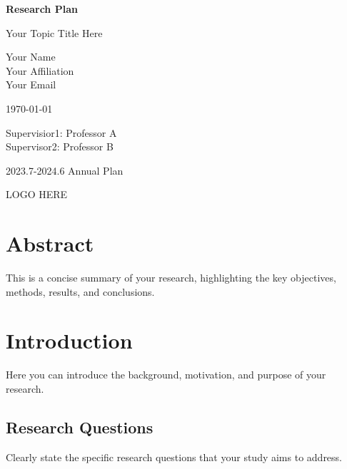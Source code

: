 \documentclass{article}
\newcommand\supervisorinfo{
    Supervisior1: Professor A \\
    Supervisor2: Professor B
}
\newcommand\authorinfo{
    Your Name \\ 
    Your Affiliation \\ 
    Your Email
}
\begin{document}
\pagestyle{fancy}
\fancyhead[L]{\leftmark}

\begin{titlepage}
    \begin{center}
        \vspace*{3cm}
            
        \Huge
        \textbf{Research Plan}
            
        \vspace{1cm}
        \huge
        Your Topic Title Here
        
        
            
        \vspace{1.5cm}
        \Large
        
        \authorinfo
        
        \today
        
            
        \vfill
        
        \supervisorinfo
        
        2023.7-2024.6 Annual Plan
            
        \vspace{1cm}
        
       	LOGO HERE
        
        \Large
            
    \end{center}
\end{titlepage}


\newpage

\tableofcontents

\newpage

\section*{Abstract}
This is a concise summary of your research, highlighting the key objectives, methods, results, and conclusions. 

\section{Introduction}
Here you can introduce the background, motivation, and purpose of your research.

\subsection{Research Questions}
Clearly state the specific research questions that your study aims to address.
\end{document}
